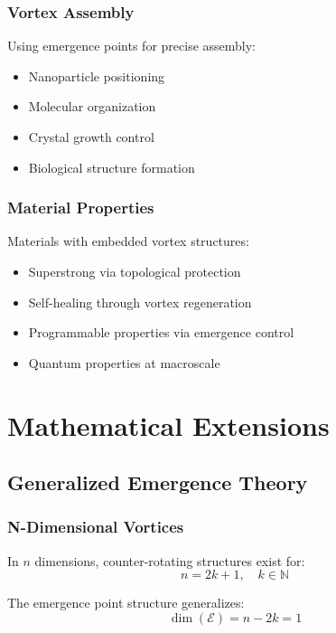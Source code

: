 \documentclass[12pt]{article}
\newcommand{\N}{\mathbb{N}}
\newcommand{\emergencept}{\mathcal{E}}
\begin{document}
\subsubsection{Vortex Assembly}

Using emergence points for precise assembly:
\begin{itemize}
\item Nanoparticle positioning
\item Molecular organization
\item Crystal growth control
\item Biological structure formation
\end{itemize}

\subsubsection{Material Properties}

Materials with embedded vortex structures:
\begin{itemize}
\item Superstrong via topological protection
\item Self-healing through vortex regeneration
\item Programmable properties via emergence control
\item Quantum properties at macroscale
\end{itemize}

\section{Mathematical Extensions}

\subsection{Generalized Emergence Theory}

\subsubsection{N-Dimensional Vortices}

In $n$ dimensions, counter-rotating structures exist for:
\begin{equation}
n = 2k + 1, \quad k \in \N
\end{equation}

The emergence point structure generalizes:
\begin{equation}
\dim(\emergencept) = n - 2k = 1
\end{equation}
\end{document}
